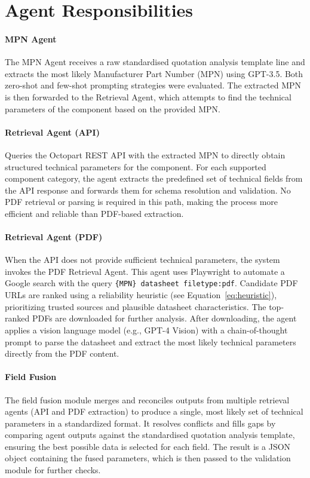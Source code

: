 \section{Agent Responsibilities}

\paragraph{MPN Agent}  
The MPN Agent receives a raw standardised quotation analysis template line and extracts the most likely Manufacturer Part Number (MPN) using GPT-3.5. Both zero-shot and few-shot prompting strategies were evaluated. The extracted MPN is then forwarded to the Retrieval Agent, which attempts to find the technical parameters of the component based on the provided MPN.


\paragraph{Retrieval Agent (API)}  
Queries the Octopart REST API with the extracted MPN to directly obtain structured technical parameters for the component.  
For each supported component category, the agent extracts the predefined set of technical fields from the API response and forwards them for schema resolution and validation.  
No PDF retrieval or parsing is required in this path, making the process more efficient and reliable than PDF-based extraction.

\paragraph{Retrieval Agent (PDF)}  
When the API does not provide sufficient technical parameters, the system invokes the PDF Retrieval Agent. This agent uses Playwright to automate a Google search with the query  
\texttt{\{MPN\} datasheet filetype:pdf}.  
Candidate PDF URLs are ranked using a reliability heuristic (see Equation~\ref{eq:heuristic}), prioritizing trusted sources and plausible datasheet characteristics. The top-ranked PDFs are downloaded for further analysis.  
After downloading, the agent applies a vision language model (e.g., GPT-4 Vision) with a chain-of-thought prompt to parse the datasheet and extract the most likely technical parameters directly from the PDF content.

\paragraph{Field Fusion}
The field fusion module merges and reconciles outputs from multiple retrieval agents (API and PDF extraction) to produce a single, most likely set of technical parameters in a standardized format. It resolves conflicts and fills gaps by comparing agent outputs against the standardised quotation analysis template, ensuring the best possible data is selected for each field. The result is a JSON object containing the fused parameters, which is then passed to the validation module for further checks.

